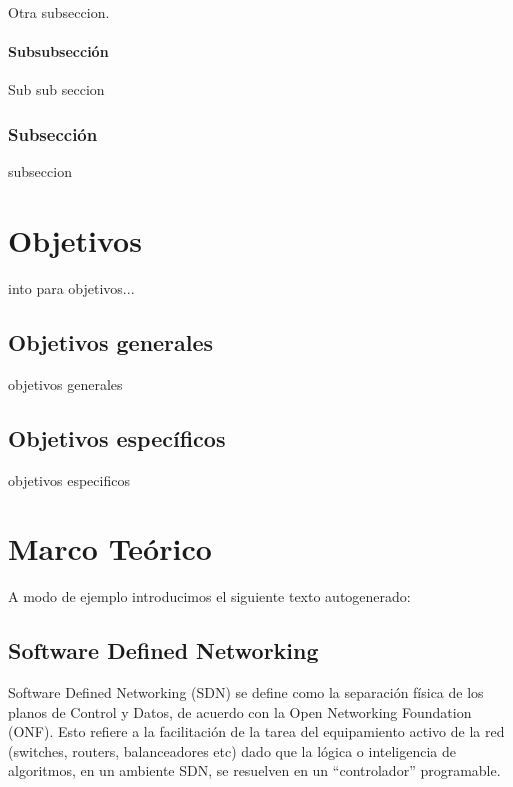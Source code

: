 \documentclass[12pt,a4paper,oneside]{book}
\begin{document}
Otra subseccion.


\subsubsection{Subsubsección}

Sub sub seccion

\subsection{Subsección}

subseccion

\chapter{Objetivos} 
\label{objetivos} %

into para objetivos...

\section{Objetivos generales}
\label{obj_generales}

objetivos generales

\section{Objetivos específicos}
\label{obj_especificos}

objetivos especificos

\chapter{Marco Teórico} 
\label{marcoteorico} %

A modo de ejemplo introducimos el siguiente texto autogenerado:



\section{Software Defined Networking}
\label{marco_sdn}


Software Defined Networking (SDN) se define como la separación física de los planos de Control y Datos, de acuerdo con la Open Networking Foundation (ONF). Esto refiere a la facilitación de la tarea del equipamiento activo de la red (switches, routers, balanceadores etc) dado que la lógica o inteligencia de algoritmos, en un ambiente SDN, se resuelven en un “controlador” programable.
\end{document}
